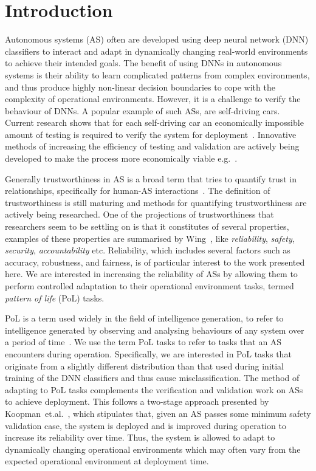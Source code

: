 \section{Introduction}

Autonomous systems (AS) often are developed using deep neural network (DNN) classifiers to interact and adapt in dynamically changing real-world environments to achieve their intended goals. 
%
The benefit of using DNNs in autonomous systems is their ability to learn complicated patterns 
from complex environments, and thus produce highly non-linear decision boundaries to cope with the complexity of operational environments.
%
However, it is a challenge to verify the behaviour of DNNs. 
%
A popular example of such ASs, are self-driving cars. Current research shows that for each self-driving car an economically impossible amount of testing is required to verify the system for deployment~\cite{RR-1478-RC}. Innovative methods of increasing the efficiency of testing and validation are actively being developed to make the process more economically viable e.g.~\cite{chance2020agency,eder2021complete}. 

Generally trustworthiness in AS is a broad term that tries to quantify trust in relationships, specifically for human-AS interactions~\cite{KateDevitt2018}.
%
The definition of trustworthiness is still maturing and methods for quantifying trustworthiness are actively being researched.
%
One of the projections of trustworthiness that researchers seem to be settling on is that it constitutes of several properties, examples of these properties are summarised by Wing~\cite{Wing2021}, like \textit{reliability}, \textit{safety}, \textit{security}, \textit{accountability} etc.
%
Reliability, which includes several factors such as accuracy, robustness, and fairness, is of particular interest to the work presented here. 
%
We are interested in increasing the reliability of ASs by allowing them to perform controlled adaptation to their operational environment tasks, termed \textit{pattern of life} (PoL) tasks.

%
PoL is a term used widely in the field of intelligence generation, to refer to intelligence generated by observing and analysing behaviours of any system over a period of time~\cite{Craddock2016}. 
%
We use the term PoL tasks to refer to tasks that an AS encounters during operation. 
%
Specifically, we are interested in PoL tasks that originate from a slightly different distribution than that used during initial training of the DNN classifiers and thus cause misclassification.  
%
The method of adapting to PoL tasks complements the verification and validation work on ASs to achieve deployment.%
%
This follows a two-stage approach presented by Koopman~et.al.~\cite{Koopman2020}, which stipulates that, given an AS passes some minimum safety validation case, the system is deployed and is improved during operation to increase its reliability over time. 
%
Thus, the system is allowed to adapt to dynamically changing operational environments which may often vary from the expected operational environment at deployment time.

